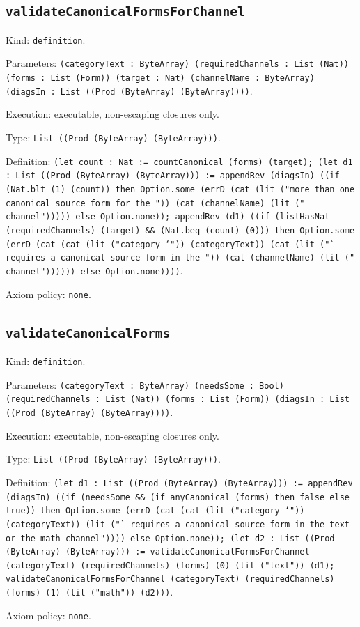 \documentclass[11pt]{article}
\begin{document}
\subsection*{\texttt{validateCanonicalFormsForChannel}}
\noindent Kind: \texttt{definition}.\par
\noindent Parameters: \texttt{(categoryText : ByteArray) (requiredChannels : List (Nat)) (forms : List (Form)) (target : Nat) (channelName : ByteArray) (diagsIn : List ((Prod (ByteArray) (ByteArray))))}.\par
\noindent Execution: executable, non-escaping closures only.\par
\noindent Type: \texttt{List ((Prod (ByteArray) (ByteArray)))}.\par
\noindent Definition: \texttt{(let count : Nat := countCanonical (forms) (target); (let d1 : List ((Prod (ByteArray) (ByteArray))) := appendRev (diagsIn) ((if (Nat.blt (1) (count)) then Option.some (errD (cat (lit ("more than one canonical source form for the ")) (cat (channelName) (lit (" channel"))))) else Option.none)); appendRev (d1) ((if (listHasNat (requiredChannels) (target) \&\& (Nat.beq (count) (0))) then Option.some (errD (cat (cat (lit ("category `")) (categoryText)) (cat (lit ("` requires a canonical source form in the ")) (cat (channelName) (lit (" channel")))))) else Option.none))))}.\par
\noindent Axiom policy: \texttt{none}.\par
\subsection*{\texttt{validateCanonicalForms}}
\noindent Kind: \texttt{definition}.\par
\noindent Parameters: \texttt{(categoryText : ByteArray) (needsSome : Bool) (requiredChannels : List (Nat)) (forms : List (Form)) (diagsIn : List ((Prod (ByteArray) (ByteArray))))}.\par
\noindent Execution: executable, non-escaping closures only.\par
\noindent Type: \texttt{List ((Prod (ByteArray) (ByteArray)))}.\par
\noindent Definition: \texttt{(let d1 : List ((Prod (ByteArray) (ByteArray))) := appendRev (diagsIn) ((if (needsSome \&\& (if anyCanonical (forms) then false else true)) then Option.some (errD (cat (cat (lit ("category `")) (categoryText)) (lit ("` requires a canonical source form in the text or the math channel")))) else Option.none)); (let d2 : List ((Prod (ByteArray) (ByteArray))) := validateCanonicalFormsForChannel (categoryText) (requiredChannels) (forms) (0) (lit ("text")) (d1); validateCanonicalFormsForChannel (categoryText) (requiredChannels) (forms) (1) (lit ("math")) (d2)))}.\par
\noindent Axiom policy: \texttt{none}.\par
\end{document}
